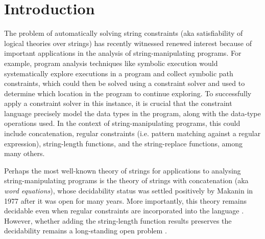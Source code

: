 
\section{Introduction}

The problem of %
automatically solving string constraints (aka satisfiability of logical theories over
strings) has recently witnessed
renewed interest %
\cite{Berkeley-JavaScript,TCJ16,LB16,YABI14,S3,Abdulla14,Abdulla17,DV13,symbolic-transducer,BEK} 
because of important applications in the analysis of 
string-manipulating programs. For example,
program analysis techniques like symbolic execution \cite{king76,DART,EXE} 
would
systematically explore executions in a program and collect symbolic path 
constraints, which could then be solved using a constraint solver and
used to determine which location in the program to continue exploring.
To successfully apply a constraint solver in this instance, it is
crucial that the constraint language precisely model the data types in the
program, along with the data-type operations used. In the context of
string-manipulating programs, this could include 
concatenation, regular constraints (i.e. pattern matching against a regular
expression), string-length functions, and the string-replace functions, among 
many others.

Perhaps the most well-known theory of strings for applications to analysing
string-manipulating programs is the theory of strings with concatenation 
(aka \emph{word equations}),
whose decidability status was settled positively by Makanin \cite{Makanin}
in 1977 after it was open for many years. More importantly, 
this theory remains 
decidable even when regular constraints are incorporated into the 
language \cite{Schulz}. However, whether adding the string-length function
results preserves the decidability remains a long-standing open problem
\cite{Vijay-length,buchi}.

